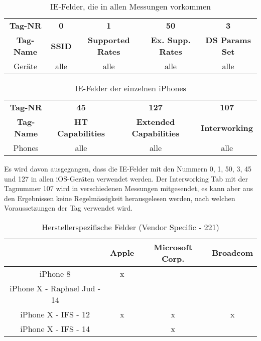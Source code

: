 \begin{table}[h!]
    \centering
    \begin{tabular}{|c|c|c|c|c|}
        \hline
        \textbf{Tag-NR} & \textbf{0} & \textbf{1} & \textbf{50} & \textbf{3} \\
        \textbf{Tag-Name} & \textbf{SSID} & \textbf{Supported Rates} & \textbf{Ex. Supp. Rates} & \textbf{DS Params Set} \\
        \hline 
        Geräte & alle & alle & alle & alle \\
        \hline
    \end{tabular}
    \caption{IE-Felder, die in allen Messungen vorkommen
    \label{table:ioscommoniefields}}  
\end{table}

\begin{table}[h!]
    \centering
    \begin{tabular}{|c|c|c|c|}
        \hline
        \textbf{Tag-NR} & \textbf{45} & \textbf{127} & \textbf{107} \\
        \textbf{Tag-Name} & \textbf{HT Capabilities} & \textbf{Extended Capabilities} & \textbf{Interworking} \\
        \hline 
        Phones  & alle & alle & alle \\
        \hline
    \end{tabular}
    \caption{IE-Felder der einzelnen iPhones
    \label{table:iosuncommoniefields}}  
\end{table}

Es wird davon ausgegangen, dass die IE-Felder mit den Nummern 0, 1, 50, 3, 45 
und 127 in allen iOS-Geräten verwendet werden. 
Der Interworking Tab mit der Tagnummer 107 wird in verschiedenen Messungen 
mitgesendet, es kann aber aus den Ergebnissen keine Regelmässigkeit herausgelesen
werden, nach welchen Voraussetzungen der Tag verwendet wird.

\clearpage 

\begin{table}[h!]
    \centering
    \begin{tabular}{|c|c|c|c|}
        \hline
        &  \textbf{Apple}  & \textbf{Microsoft Corp.} & \textbf{Broadcom} \\
        \hline 
        iPhone 8 & x  &  & \\
        iPhone X - Raphael Jud - 14 & & & \\
        iPhone X - IFS - 12 & x  & x & x \\
        iPhone X - IFS - 14 &  & x & \\
        \hline
    \end{tabular}
    \caption{Herstellerspezifische Felder (Vendor Specific - 221)
    \label{table:iosvendorspecificiefields}}  
\end{table}

